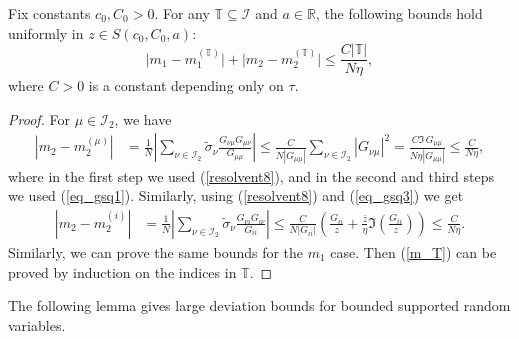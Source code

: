 \begin{lemma}
Fix constants $c_0,C_0>0$. For any $\mathbb T \subseteq \mathcal I$ and $a\in \mathbb R$, the following bounds hold uniformly in $z\in S(c_0,C_0,a)$:
\begin{equation}\label{m_T}
\big| {m_1  - m_1^{\left( \mathbb T \right)} } \big| + \big| {m_2  - m_2^{\left( \mathbb T \right)} } \big| \le \frac{{C\left| \mathbb T \right|}}{{N\eta }}, %
\end{equation}
where $C>0$ is a constant depending only on $\tau$.
\end{lemma}
\begin{proof}
For $\mu\in\mathcal I_2$, we have
\begin{align*}
\left|m_2-m_2^{(\mu)}\right|& =\frac{1}{N}\left|\sum_{\nu\in\mathcal I_2}  \tilde \sigma_\nu\frac{G_{\nu\mu}G_{\mu\nu}}{G_{\mu\mu}}\right| \le \frac{C}{N|G_{\mu\mu}|} \sum_{\nu\in\mathcal I_2} |G_{\nu\mu}|^2 = \frac{C\Im\, G_{\mu\mu}}{N\eta |G_{\mu\mu}|} \le \frac{C}{N\eta}, %
\end{align*}
where in the first step we used (\ref{resolvent8}), and in the second and third steps we used (\ref{eq_gsq1}). Similarly, using (\ref{resolvent8}) and (\ref{eq_gsq3}) we get
\begin{align*}
\left|m_2 -m_2^{(i)}\right| & = \frac{1}{N}\left|\sum_{\nu \in\mathcal I_2}\tilde \sigma_\nu\frac{G_{\nu i}G_{i\nu}}{G_{ii}}\right| \le \frac{C}{N|G_{ii}|} \left( \frac{{G}_{ii}}{z}  + \frac{\bar z}{\eta} \Im\left(\frac{{G_{ii} }}{z}\right)\right)   \le \frac{C}{N\eta}.
\end{align*}
Similarly, we can prove the same bounds for the $m_1$ case. Then (\ref{m_T}) can be proved by induction on the indices in $\mathbb T$. %
\end{proof}

The following lemma gives large deviation bounds for bounded supported random variables. 

